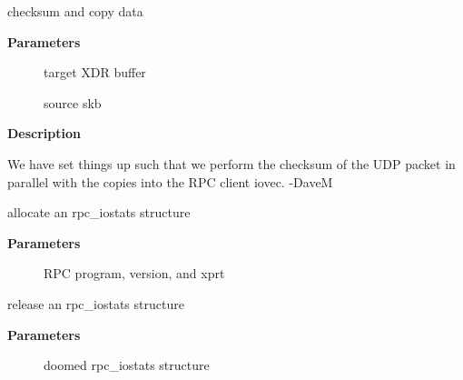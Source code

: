 \documentclass[a4paper,8pt,english]{sphinxmanual}
\begin{document}
\begin{fulllineitems}
\label{networking/kapi:c.csum_partial_copy_to_xdr}
checksum and copy data

\end{fulllineitems}


\textbf{Parameters}
\begin{description}
\item[{}] \leavevmode
target XDR buffer

\item[{}] \leavevmode
source skb

\end{description}

\textbf{Description}

We have set things up such that we perform the checksum of the UDP
packet in parallel with the copies into the RPC client iovec.  -DaveM

\begin{fulllineitems}
\label{networking/kapi:c.rpc_alloc_iostats}
allocate an rpc\_iostats structure

\end{fulllineitems}


\textbf{Parameters}
\begin{description}
\item[{}] \leavevmode
RPC program, version, and xprt

\end{description}

\begin{fulllineitems}
\label{networking/kapi:c.rpc_free_iostats}
release an rpc\_iostats structure

\end{fulllineitems}


\textbf{Parameters}
\begin{description}
\item[{}] \leavevmode
doomed rpc\_iostats structure

\end{description}
\end{document}

